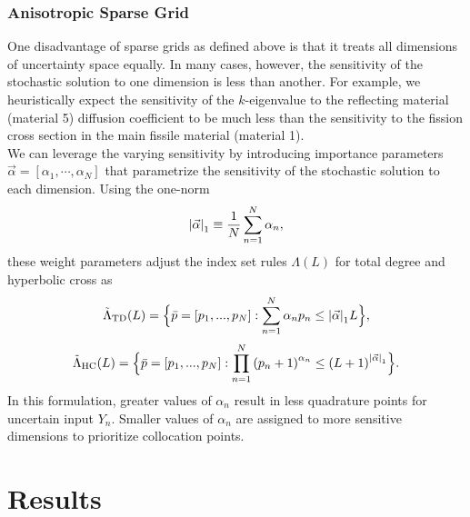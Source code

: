 \documentclass[11pt]{article}
\begin{document}
\subsubsection{Anisotropic Sparse Grid}
One disadvantage of sparse grids as defined above is that it treats all dimensions of uncertainty space equally.  In many cases, however, the sensitivity of the stochastic solution to one dimension is less than another.  For example, we heuristically expect the sensitivity of the $k$-eigenvalue to the reflecting material (material 5) diffusion coefficient to be much less than the sensitivity to the fission cross section in the main fissile material (material 1).  \\

We can leverage the varying sensitivity by introducing importance parameters $\vec\alpha=[\alpha_1,\cdots,\alpha_N]$ that parametrize the sensitivity of the stochastic solution to each dimension.  Using the one-norm
\begin{equation}
\qty|\vec\alpha|_1\equiv\frac{1}{N}\sum_{n=1}^N \alpha_n,
\end{equation}
these weight parameters adjust the index set rules $\Lambda(L)$ for total degree and hyperbolic cross as
\begin{equation}
\tilde\Lambda_\text{TD}(L)=\Big\{\bar p=[p_1,...,p_N]:\sum_{n=1}^N \alpha_n p_n \leq \qty|\vec\alpha|_1 L \Big\},
\end{equation}
\begin{equation}
\tilde\Lambda_\text{HC}(L)=\Big\{\bar p=[p_1,...,p_N]:\prod_{n=1}^N \qty(p_n+1)^{\alpha_n} \leq \qty(L+1)^{\qty|\vec\alpha|_1} \Big\}.
\end{equation}
In this formulation, greater values of $\alpha_n$ result in less quadrature points for uncertain input $Y_n$.  Smaller values of $\alpha_n$ are assigned to more sensitive dimensions to prioritize collocation points.


\section{Results}\label{results}
\end{document}

